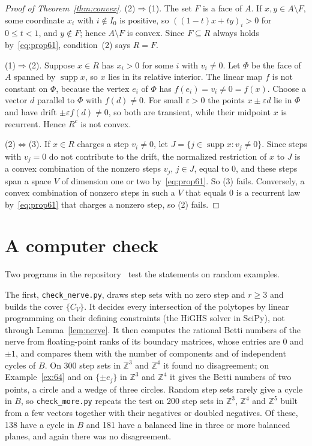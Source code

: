 \documentclass[11pt]{amsart}
\theoremstyle{remark}
\newcommand{\Z}{\mathbb{Z}}
\newcommand{\supp}{\operatorname{supp}}
\begin{document}
\begin{proof}[Proof of Theorem~\ref{thm:convex}]
(2)$\Rightarrow$(1). The set $F$ is a face of $A$. If $x,y\in A\setminus F$, some coordinate $x_i$ with $i\notin I_0$
is positive, so $((1-t)x+ty)_i>0$ for $0\le t<1$, and $y\notin F$; hence $A\setminus F$ is convex. Since $F\subseteq R$
always holds by~\eqref{eq:prop61}, condition~(2) says $R=F$.

(1)$\Rightarrow$(2). Suppose $x\in R$ has $x_i>0$ for some $i$ with $v_i\ne0$. Let $\Phi$ be the face of $A$ spanned by
$\supp x$, so $x$ lies in its relative interior. The linear map $f$ is not constant on $\Phi$, because the vertex $e_i$
of $\Phi$ has $f(e_i)=v_i\ne0=f(x)$. Choose a vector $d$ parallel to $\Phi$ with $f(d)\ne0$. For small $\varepsilon>0$
the points $x\pm\varepsilon d$ lie in $\Phi$ and have drift $\pm\varepsilon f(d)\ne0$, so both are transient, while
their midpoint $x$ is recurrent. Hence $R^c$ is not convex.

(2)$\Leftrightarrow$(3). If $x\in R$ charges a step $v_i\ne0$, let $J=\{j\in\supp x: v_j\ne0\}$. Since steps with
$v_j=0$ do not contribute to the drift, the normalized restriction of $x$ to $J$ is a convex combination of the nonzero
steps $v_j$, $j\in J$, equal to $0$, and these steps span a space $V$ of dimension one or two by~\eqref{eq:prop61}. So
(3) fails. Conversely, a convex combination of nonzero steps in such a $V$ that equals $0$ is a recurrent law
by~\eqref{eq:prop61} that charges a nonzero step, so (2) fails.
\end{proof}

\section{A computer check}\label{sec:checks}

Two programs in the repository~\cite{Repo} test the statements on random examples.

The first, \texttt{check\_nerve.py}, draws step sets with no zero step and $r\ge3$ and builds the cover $\{C_V\}$. It
decides every intersection of the polytopes by linear programming on their defining constraints (the HiGHS solver
in SciPy), not through
Lemma~\ref{lem:nerve}. It then computes the rational Betti numbers of the nerve from floating-point ranks of its boundary matrices,
whose entries are $0$ and $\pm1$, and compares them with the
number of components and of independent cycles of $B$. On 300 step sets in $\Z^3$ and $\Z^4$ it found no
disagreement; on Example~\ref{ex:64} and on $\{\pm e_j\}$ in $\Z^3$ and $\Z^4$ it gives the Betti numbers of two
points, a circle and a wedge of three circles. Random step sets rarely give a cycle in $B$, so
\texttt{check\_more.py} repeats the test on 200 step sets in $\Z^3$, $\Z^4$ and $\Z^5$ built from a few vectors
together with their negatives or doubled negatives. Of these, 138 have a cycle in $B$ and 181 have a balanced line in
three or more balanced planes, and again there was no disagreement.
\end{document}
